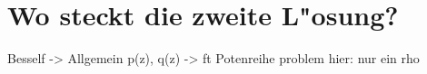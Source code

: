 \chapter{Wo steckt die zweite L"osung?\label{chapter:thema}}
\begin{refsection}



Besself -> Allgemein
p(z), q(z) -> ft Potenreihe
problem hier: nur ein rho


\printbibliography[heading=subbibliography]
\end{refsection}

